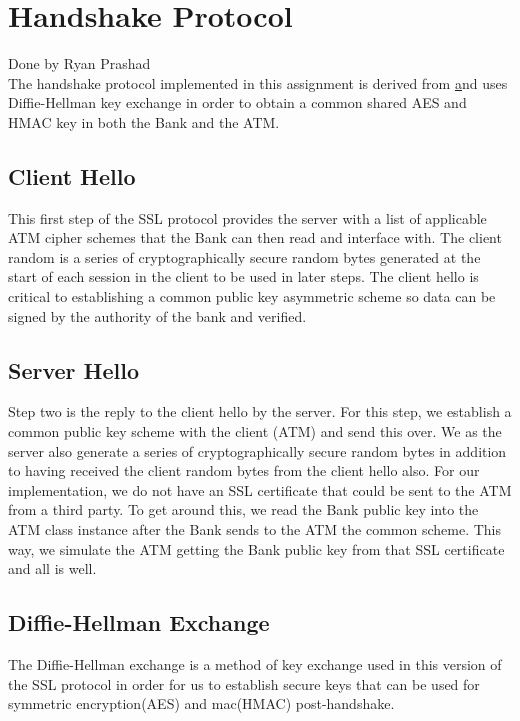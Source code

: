 \documentclass{article}
\begin{document}
\section{Handshake Protocol}\label{sec:handshake}
Done by Ryan Prashad\\

	\medskip
	The handshake protocol implemented in this assignment is derived from \href{https://www.cloudflare.com/learning/ssl/what-happens-in-a-tls-handshake/} and uses Diffie-Hellman key exchange in order to obtain a 
	common shared AES and HMAC key in both the Bank and the ATM.
	
	\subsection{Client Hello}\label{sec:clihello}
		This first step of the SSL protocol provides the server with a list of applicable ATM cipher schemes that the Bank can then read and interface with. The 
		client random is a series of cryptographically secure random bytes generated at the start of each session in the client to be used in later steps. The client
		hello is critical to establishing a common public key asymmetric scheme so data can be signed by the authority of the bank and verified.
	
	\subsection{Server Hello}\label{sec:serhello}
		Step two is the reply to the client hello by the server. For this step, we establish a common public key scheme with the client (ATM) and send this over. We
		as the server also generate a series of cryptographically secure random bytes in addition to having received the client random bytes from the client hello also. For our implementation, we do not have an SSL certificate that could be sent to the ATM from a third party. To get around this, we read the Bank public key into the ATM class instance after the Bank sends to the ATM the common scheme. This way, we simulate the ATM getting the Bank public key from that SSL certificate and all is well.
		
		\subsection{Diffie-Hellman Exchange}\label{sec:dhex}
			The Diffie-Hellman exchange is a method of key exchange used in this version of the SSL protocol in order for us to establish secure keys that can be used for symmetric encryption(AES) and mac(HMAC) post-handshake.
\end{document}

